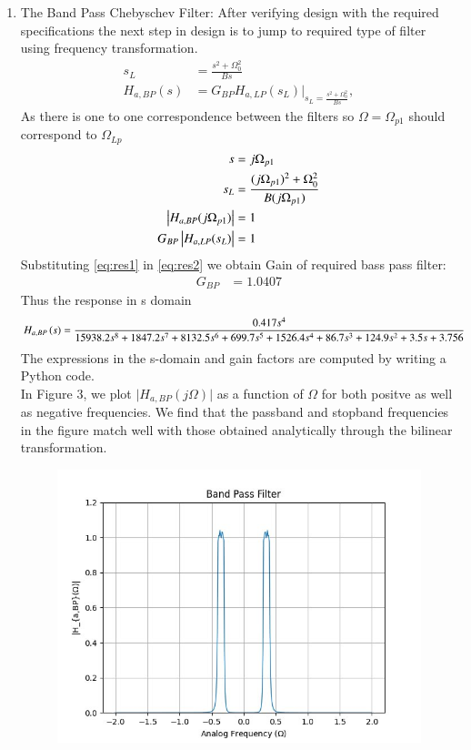 \documentclass{article}
\begin{document}
\begin{enumerate}
\item {The Band Pass Chebyschev Filter:}
After verifying design with the required specifications the next step in design is to jump to required type of filter using frequency transformation. 
\begin{align}
 s_L & = \frac{s^2 + \Omega_0^2}{Bs}                                   \\
 H_{a,BP}(s) & = G_{BP}H_{a,LP}(s_L)\vert_{s_L = \frac{s^2 + \Omega_0^2}{Bs}},
\end{align}
As there is one to one correspondence between the filters so $\Omega=\Omega_{p1}$ should correspond to $\Omega_{Lp}$
\begin{align}
s & = j\Omega_{p1}           \\
 s_{L} & = \frac{(j\Omega_{p1})^2 + \Omega_0^2}{B(j\Omega_{p1})} \label{eq:res1} \\ 
\left\vert H_{a,BP}(j\Omega_{p1})\right\vert & = 1                         \\
G_{BP}\left\vert H_{a,LP}(s_L)\right\vert    & = 1 \label{eq:res2}
\end{align}
Substituting \eqref{eq:res1} in \eqref{eq:res2} we obtain Gain of required bass pass filter:
 \begin{align}
 G_{BP} & = 1.0407 
 \end{align}
Thus the response in s domain 
\begin{align}
 H_{a,BP}\left(s\right) & = \frac{0.417s^4}{15938.2s^8 + 1847.2s^7 + 8132.5s^6 + 699.7s^5 + 1526.4s^4 + 86.7s^3 + 124.9s^2 + 3.5s + 3.756}
  \label{eq:magnitude_bandpass_sdom}
\end{align}
The expressions in the s-domain and gain factors are computed by writing a Python code. \\
 In Figure 3, we plot $\vert H_{a,BP}(j\Omega)\vert$ as a function of $\Omega$ for both positve as
 well as negative frequencies.  We find that the passband and stopband frequencies in the figure
 match well with those obtained analytically through the bilinear transformation.
\begin{figure}[H]
\centering
\includegraphics[width=1\columnwidth]{figs/Band_Pass_Filter.png}

\end{figure}
\end{enumerate}
\end{document}
